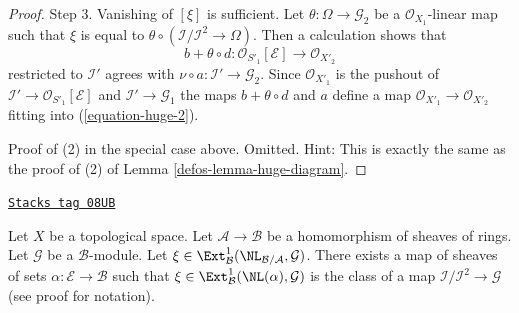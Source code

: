 \begin{proof}
\medskip\noindent
Step 3. Vanishing of $[\xi]$ is sufficient. Let
$\theta : \Omega \to \mathcal{G}_2$ be a $\mathcal{O}_{X_1}$-linear map
such that $\xi$ is equal to
$\theta \circ (\mathcal{I}/\mathcal{I}^2 \to \Omega)$.
Then a calculation shows that
$$
b + \theta \circ d : \mathcal{O}_{S'_1}[\mathcal{E}] \to \mathcal{O}_{X'_2}
$$
restricted to $\mathcal{I}'$ agrees with
$\nu \circ a : \mathcal{I}' \to \mathcal{G}_2$. Since $\mathcal{O}_{X'_1}$
is the pushout of $\mathcal{I}' \to \mathcal{O}_{S'_1}[\mathcal{E}]$
and $\mathcal{I}' \to \mathcal{G}_1$ the maps $b + \theta \circ d$
and $a$ define a map
$\mathcal{O}_{X'_1} \to \mathcal{O}_{X'_2}$ fitting into
(\ref{equation-huge-2}).

\medskip\noindent
Proof of (2) in the special case above. Omitted. Hint:
This is exactly the same as the proof of (2) of Lemma \ref{defos-lemma-huge-diagram}.
\end{proof}

\begin{lemma}
\label{defos-lemma-NL-represent-ext-class}
\href{https://stacks.math.columbia.edu/tag/08UB}{\texttt{Stacks tag 08UB}}

Let $X$ be a topological space. Let $\mathcal{A} \to \mathcal{B}$ be a
homomorphism of sheaves of rings. Let $\mathcal{G}$ be a $\mathcal{B}$-module.
Let
$\xi \in \Ext^1_\mathcal{B}(\NL_{\mathcal{B}/\mathcal{A}}, \mathcal{G})$.
There exists a map of sheaves of sets $\alpha : \mathcal{E} \to \mathcal{B}$
such that $\xi \in \Ext^1_\mathcal{B}(\NL(\alpha), \mathcal{G})$
is the class of a map $\mathcal{I}/\mathcal{I}^2 \to \mathcal{G}$
(see proof for notation).
\end{lemma}


